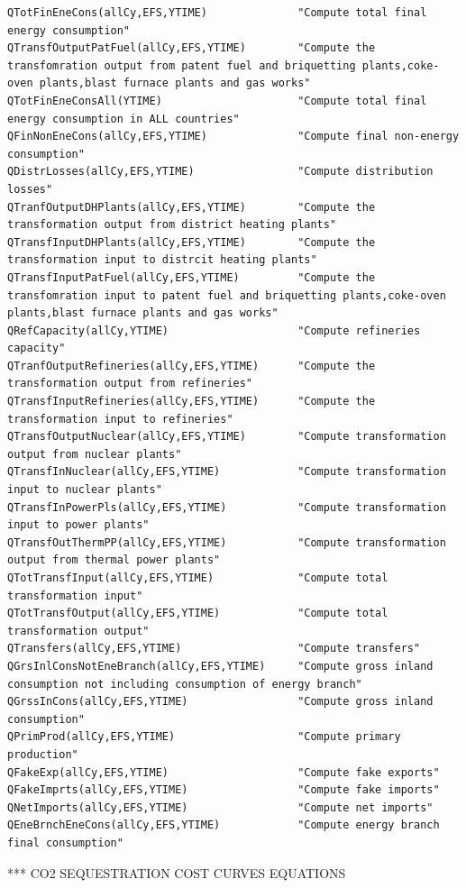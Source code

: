 \documentclass[a4paper,]{scrartcl}
\begin{document}
\begin{lstlisting}
QTotFinEneCons(allCy,EFS,YTIME)              "Compute total final energy consumption"
QTransfOutputPatFuel(allCy,EFS,YTIME)        "Compute the  transfomration output from patent fuel and briquetting plants,coke-oven plants,blast furnace plants and gas works"   
QTotFinEneConsAll(YTIME)                     "Compute total final energy consumption in ALL countries"
QFinNonEneCons(allCy,EFS,YTIME)              "Compute final non-energy consumption"
QDistrLosses(allCy,EFS,YTIME)                "Compute distribution losses"
QTranfOutputDHPlants(allCy,EFS,YTIME)        "Compute the transformation output from district heating plants"
QTransfInputDHPlants(allCy,EFS,YTIME)        "Compute the transformation input to distrcit heating plants"
QTransfInputPatFuel(allCy,EFS,YTIME)         "Compute the transfomration input to patent fuel and briquetting plants,coke-oven plants,blast furnace plants and gas works"
QRefCapacity(allCy,YTIME)                    "Compute refineries capacity"  
QTranfOutputRefineries(allCy,EFS,YTIME)      "Compute the transformation output from refineries"
QTransfInputRefineries(allCy,EFS,YTIME)      "Compute the transformation input to refineries"
QTransfOutputNuclear(allCy,EFS,YTIME)        "Compute transformation output from nuclear plants"
QTransfInNuclear(allCy,EFS,YTIME)            "Compute transformation input to nuclear plants"
QTransfInPowerPls(allCy,EFS,YTIME)           "Compute transformation input to power plants" 
QTransfOutThermPP(allCy,EFS,YTIME)           "Compute transformation output from thermal power plants"
QTotTransfInput(allCy,EFS,YTIME)             "Compute total transformation input"
QTotTransfOutput(allCy,EFS,YTIME)            "Compute total transformation output"
QTransfers(allCy,EFS,YTIME)                  "Compute transfers"
QGrsInlConsNotEneBranch(allCy,EFS,YTIME)     "Compute gross inland consumption not including consumption of energy branch"  
QGrssInCons(allCy,EFS,YTIME)                 "Compute gross inland consumption" 
QPrimProd(allCy,EFS,YTIME)                   "Compute primary production"   
QFakeExp(allCy,EFS,YTIME)                    "Compute fake exports" 
QFakeImprts(allCy,EFS,YTIME)                 "Compute fake imports" 
QNetImports(allCy,EFS,YTIME)                 "Compute net imports"
QEneBrnchEneCons(allCy,EFS,YTIME)            "Compute energy branch final consumption"
\end{lstlisting}

*** CO2 SEQUESTRATION COST CURVES EQUATIONS
\end{document}
